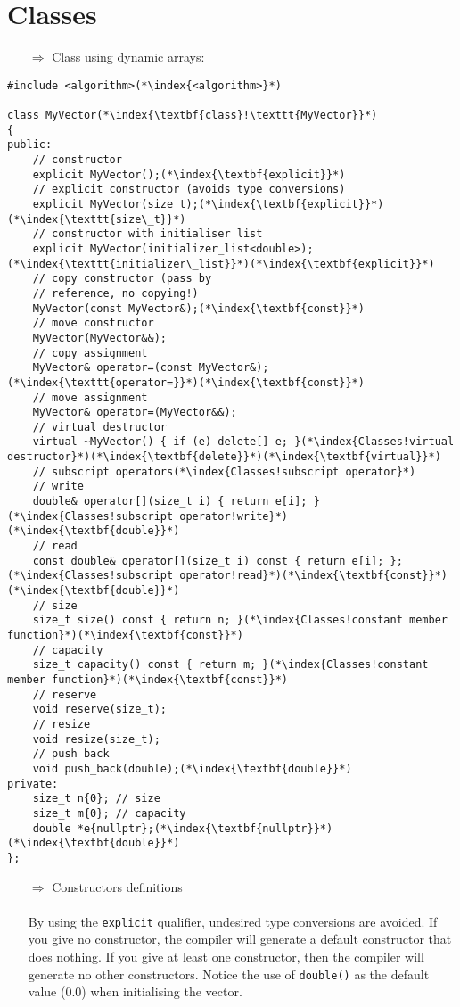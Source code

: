 \documentclass[10pt]{article}
\begin{document}
\section{Classes}
\small
\begin{enumerate}
\item[$\Rightarrow$] Class using dynamic arrays:
\end{enumerate}
\begin{lstlisting}
#include <algorithm>(*\index{<algorithm>}*)

class MyVector(*\index{\textbf{class}!\texttt{MyVector}}*)
{
public:
    // constructor
    explicit MyVector();(*\index{\textbf{explicit}}*)
    // explicit constructor (avoids type conversions)
    explicit MyVector(size_t);(*\index{\textbf{explicit}}*)(*\index{\texttt{size\_t}}*)
    // constructor with initialiser list
    explicit MyVector(initializer_list<double>);(*\index{\texttt{initializer\_list}}*)(*\index{\textbf{explicit}}*)
    // copy constructor (pass by
    // reference, no copying!)
    MyVector(const MyVector&);(*\index{\textbf{const}}*)
    // move constructor
    MyVector(MyVector&&);
    // copy assignment
    MyVector& operator=(const MyVector&);(*\index{\texttt{operator=}}*)(*\index{\textbf{const}}*)
    // move assignment
    MyVector& operator=(MyVector&&);
    // virtual destructor
    virtual ~MyVector() { if (e) delete[] e; }(*\index{Classes!virtual destructor}*)(*\index{\textbf{delete}}*)(*\index{\textbf{virtual}}*)
    // subscript operators(*\index{Classes!subscript operator}*)
    // write
    double& operator[](size_t i) { return e[i]; }(*\index{Classes!subscript operator!write}*)(*\index{\textbf{double}}*)
    // read
    const double& operator[](size_t i) const { return e[i]; };(*\index{Classes!subscript operator!read}*)(*\index{\textbf{const}}*)(*\index{\textbf{double}}*)
    // size
    size_t size() const { return n; }(*\index{Classes!constant member function}*)(*\index{\textbf{const}}*)
    // capacity
    size_t capacity() const { return m; }(*\index{Classes!constant member function}*)(*\index{\textbf{const}}*)
    // reserve
    void reserve(size_t);
    // resize
    void resize(size_t);
    // push back
    void push_back(double);(*\index{\textbf{double}}*)
private:
    size_t n{0}; // size
    size_t m{0}; // capacity
    double *e{nullptr};(*\index{\textbf{nullptr}}*)(*\index{\textbf{double}}*)
};
\end{lstlisting}
\begin{enumerate}
\item[$\Rightarrow$] Constructors definitions\\ \\ By using the \texttt{explicit} qualifier, undesired type conversions are avoided. If you give no constructor, the compiler will generate a default constructor that does nothing.
If you give at least one constructor, then the compiler will generate no other constructors. Notice the use of \texttt{double()} as the default value (0.0)
when initialising the vector.
\end{enumerate}
\end{document}
